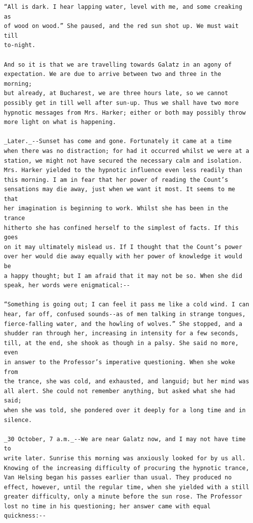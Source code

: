 \documentclass{article}
\begin{document}
\begin{verbatim}
“All is dark. I hear lapping water, level with me, and some creaking as
of wood on wood.” She paused, and the red sun shot up. We must wait till
to-night.

And so it is that we are travelling towards Galatz in an agony of
expectation. We are due to arrive between two and three in the morning;
but already, at Bucharest, we are three hours late, so we cannot
possibly get in till well after sun-up. Thus we shall have two more
hypnotic messages from Mrs. Harker; either or both may possibly throw
more light on what is happening.

_Later._--Sunset has come and gone. Fortunately it came at a time
when there was no distraction; for had it occurred whilst we were at a
station, we might not have secured the necessary calm and isolation.
Mrs. Harker yielded to the hypnotic influence even less readily than
this morning. I am in fear that her power of reading the Count’s
sensations may die away, just when we want it most. It seems to me that
her imagination is beginning to work. Whilst she has been in the trance
hitherto she has confined herself to the simplest of facts. If this goes
on it may ultimately mislead us. If I thought that the Count’s power
over her would die away equally with her power of knowledge it would be
a happy thought; but I am afraid that it may not be so. When she did
speak, her words were enigmatical:--

“Something is going out; I can feel it pass me like a cold wind. I can
hear, far off, confused sounds--as of men talking in strange tongues,
fierce-falling water, and the howling of wolves.” She stopped, and a
shudder ran through her, increasing in intensity for a few seconds,
till, at the end, she shook as though in a palsy. She said no more, even
in answer to the Professor’s imperative questioning. When she woke from
the trance, she was cold, and exhausted, and languid; but her mind was
all alert. She could not remember anything, but asked what she had said;
when she was told, she pondered over it deeply for a long time and in
silence.

_30 October, 7 a.m._--We are near Galatz now, and I may not have time to
write later. Sunrise this morning was anxiously looked for by us all.
Knowing of the increasing difficulty of procuring the hypnotic trance,
Van Helsing began his passes earlier than usual. They produced no
effect, however, until the regular time, when she yielded with a still
greater difficulty, only a minute before the sun rose. The Professor
lost no time in his questioning; her answer came with equal quickness:--


\end{verbatim}
\end{document}
